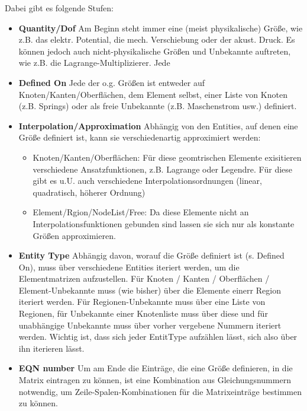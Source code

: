 \noindent
Dabei gibt es folgende Stufen:
\begin{itemize}
\item {\bf Quantity/Dof}\newline 
  Am Beginn steht immer eine (meist physikalische)
  Größe, wie z.B. das elektr. Potential, die mech. Verschiebung oder
  der akust. Druck. Es können jedoch auch nicht-physikalische Größen
  und Unbekannte auftreten, wie z.B. die Lagrange-Multiplizierer. Jede
\item {\bf Defined On} \newline
  Jede der o.g. Größen ist entweder auf
  Knoten/Kanten/Oberflächen, dem Element selbst, einer Liste von
  Knoten (z.B. Springs) oder als freie Unbekannte (z.B. Maschenstrom
  usw.) definiert.
\item {\bf Interpolation/Approximation} \newline 
  Abhängig von den Entities, auf
  denen eine Größe definiert ist, kann sie verschiedenartig
  approximiert werden:
  \begin{itemize}
  \item Knoten/Kanten/Oberflächen: Für diese geomtrischen Elemente
    exisitieren verschiedene Ansatzfunktionen, z.B. Lagrange oder
    Legendre. Für diese gibt es u.U. auch verschiedene
    Interpolationsordnungen (linear, quadratisch, höherer Ordnung)
  \item Element/Rgion/NodeList/Free: Da diese Elemente nicht an
    Interpolationsfunktionen gebunden sind lassen sie sich nur als
    konstante Größen approximieren.
  \end{itemize}
\item {\bf Entity Type} \newline
  Abhängig davon, worauf die Größe definiert ist (s. Defined On), muss
  über verschiedene Entities iteriert werden, um die Elementmatrizen
  aufzustellen. Für Knoten / Kanten / Oberflächen / Element-Unbekannte muss
  (wie bisher) über die Elemente einerr Region iteriert werden. Für
  Regionen-Unbekannte muss über eine Liste von Regionen, für
  Unbekannte einer Knotenliste muss über diese und für unabhängige
  Unbekannte muss über vorher vergebene Nummern iteriert
  werden. Wichtig ist, dass sich jeder EntitType aufzählen lässt,
  sich also über ihn iterieren lässt.
\item {\bf EQN number} \newline
  Um am Ende die Einträge, die eine Größe definieren, in die Matrix
  eintragen zu können, ist eine Kombination aus Gleichungsnummern
  notwendig, um Zeile-Spalen-Kombinationen für die Matrixeinträge
  bestimmen zu können.
\end{itemize}

